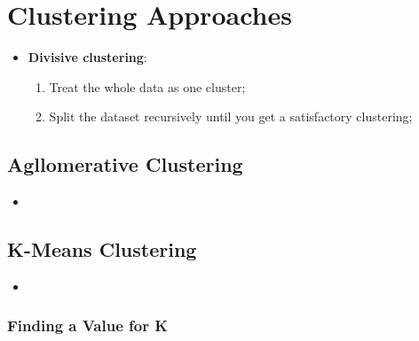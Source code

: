 \section{Clustering Approaches}
  
  \begin{itemize}
    \item \textbf{Divisive clustering}:
    \begin{enumerate}
      \item Treat the whole data as one cluster;
      \item Split the dataset recursively until you get a satisfactory clustering;
    \end{enumerate}
  \end{itemize}
  
  \subsection{Agllomerative Clustering}
  
    \begin{itemize}
      \item 
    \end{itemize}
    
  \subsection{K-Means Clustering}
  
    \begin{itemize}
      \item 
    \end{itemize}
    
    \subsubsection{Finding a Value for K}
    
      